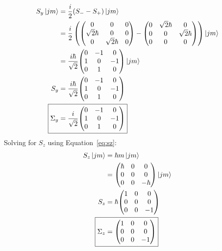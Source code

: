 \documentclass{jhwhw}
\begin{document}
\begin{align}
    S_{y}\ket{j m}
    &=
    \frac{i}{2}(S_- - S_+)\ket{j m}
    \\
    &=
    \frac{i}{2}
    \left(
    \begin{pmatrix}
        0   &   0   &   0   \\
        \sqrt{2}\hbar   &   0   &   0   \\
        0   &   \sqrt{2}\hbar   &   0   
    \end{pmatrix}
    -
    \begin{pmatrix}
        0   &   \sqrt{2}\hbar   &   0   \\
        0   &   0   &   \sqrt{2}\hbar   \\
        0   &   0   &   0   
    \end{pmatrix}
    \right)\ket{j m}
    \\
    &=
    \frac{i \hbar}{\sqrt{2}}
    {\begin{pmatrix}
        0   &   -1   &   0   \\
        1   &   0   &   -1   \\
        0   &   1   &   0   
    \end{pmatrix}}
    \ket{j m}
    \\
    S_{y}
    &=
    \frac{i\hbar}{\sqrt{2}}
    {\begin{pmatrix}
        0   &   -1   &   0   \\
        1   &   0   &   -1   \\
        0   &   1   &   0   
    \end{pmatrix}}
    \\
    \Aboxed{
    \Sigma_{y}
    &=
    \frac{i}{\sqrt{2}}
    {\begin{pmatrix}
        0   &   -1   &   0   \\
        1   &   0   &   -1   \\
        0   &   1   &   0   
    \end{pmatrix}}}
\end{align}
Solving for $S_z$ using Equation~\eqref{eq:sz}:
\begin{align}
    S_{z}\ket{j m}
    &=
    \hbar m\ket{j m}
    \\
    &=
    \begin{pmatrix}
        \hbar   &   0   &   0   \\
        0   &   0   &   0   \\
        0   &   0   &   -\hbar
    \end{pmatrix}
    \ket{j m}
    \\
     S_{z}
     &=
     \hbar 
     {\begin{pmatrix}
         1   &   0   &   0   \\
         0   &   0   &   0   \\
         0   &   0   &   -1
     \end{pmatrix}}
     \\
     \Aboxed{
     \Sigma_{z}
     &=
     {\begin{pmatrix}
          1   &   0   &   0   \\
          0   &   0   &   0   \\
          0   &   0   &   -1
      \end{pmatrix}}}
\end{align}
\end{document}
